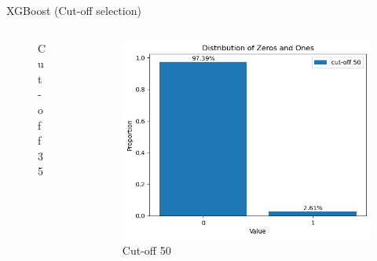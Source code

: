 \documentclass{beamer}
\begin{document}
\begin{frame}{XGBoost (Cut-off selection)}
\begin{columns}[T]
\begin{column}{0.33\textwidth}
\begin{figure}
        \caption{Cut-off 35}
      \end{figure}
    \end{column}
    \begin{column}{0.33\textwidth}
      \begin{figure}
        \centering
        \includegraphics[width=\textwidth]{distribution_cutoff_50.png}
        \caption{Cut-off 50}
      \end{figure}
    \end{column}
  \end{columns}
\end{frame}
\end{document}
